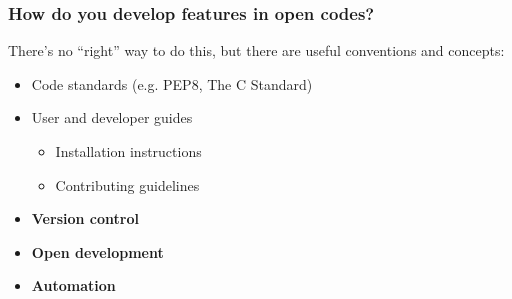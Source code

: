 \begin{frame}[t]
    \frametitle{How do you develop features in open codes?}

    There's no ``right'' way to do this, but there are useful conventions and concepts:
    \begin{itemize}
        \item Code standards (e.g. PEP8, The C Standard)
        \item User and developer guides
        \begin{itemize}
            \item Installation instructions
            \item Contributing guidelines
        \end{itemize}
        \item {\bf Version control}
        \item {\bf Open development}
        \item {\bf Automation}
    \end{itemize}
\end{frame}
